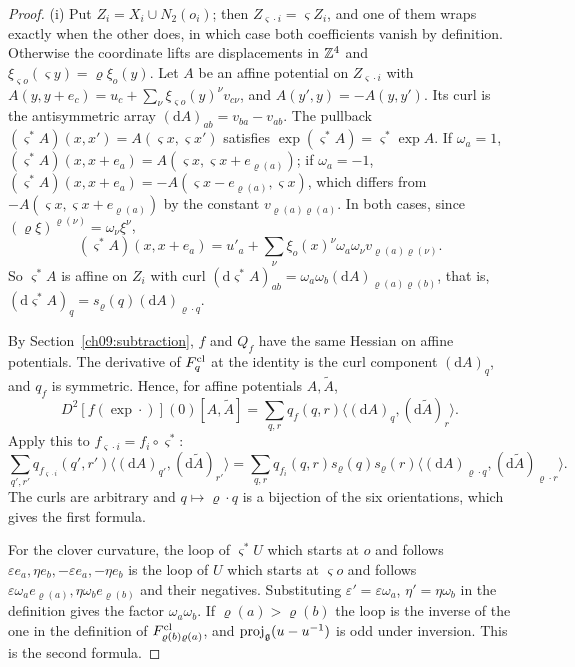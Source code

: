 \begin{proof}
(i) Put $Z_i=X_i\cup N_2(o_i)$; then
$Z_{\varsigma\cdot i}=\varsigma Z_i$, and one of them wraps exactly
when the other does, in which case both coefficients vanish by
definition. Otherwise the coordinate lifts are displacements in $\mathbb Z^4$
and $\xi_{\varsigma o}(\varsigma y)=\varrho\xi_o(y)$. Let $A$ be an
affine potential on $Z_{\varsigma\cdot i}$ with
$A(y,y+e_c)=u_c+\sum_\nu\xi_{\varsigma o}(y)^\nu v_{c\nu}$, and
$A(y',y)=-A(y,y')$. Its curl is the antisymmetric array
$(\mathrm dA)_{ab}=v_{ba}-v_{ab}$. The pullback
$(\varsigma^*A)(x,x')=A(\varsigma x,\varsigma x')$ satisfies
$\exp(\varsigma^*A)=\varsigma^*\exp A$. If $\omega_a=1$,
$(\varsigma^*A)(x,x+e_a)=A(\varsigma x,\varsigma x+e_{\varrho(a)})$;
if $\omega_a=-1$,
$(\varsigma^*A)(x,x+e_a)=-A(\varsigma x-e_{\varrho(a)},\varsigma x)$,
which differs from $-A(\varsigma x,\varsigma x+e_{\varrho(a)})$ by the
constant $v_{\varrho(a)\varrho(a)}$. In both cases, since
$(\varrho\xi)^{\varrho(\nu)}=\omega_\nu\xi^\nu$,
\[
 (\varsigma^*A)(x,x+e_a)=u'_a+\sum_\nu\xi_o(x)^\nu
     \omega_a\omega_\nu v_{\varrho(a)\varrho(\nu)} .
\]
So $\varsigma^*A$ is affine on $Z_i$ with curl
$(\mathrm d\varsigma^*A)_{ab}
=\omega_a\omega_b(\mathrm dA)_{\varrho(a)\varrho(b)}$, that is,
$(\mathrm d\varsigma^*A)_q=s_\varrho(q)(\mathrm dA)_{\varrho\cdot q}$.

By Section~\ref{ch09:subtraction}, $f$ and $Q_f$ have the same
Hessian on affine potentials. The derivative of $F^{\rm cl}_q$ at the
identity is the curl component $(\mathrm dA)_q$, and $q_f$ is
symmetric. Hence, for affine potentials $A,\widetilde A$,
\[
 D^2[f(\exp\cdot)](0)[A,\widetilde A]
     =\sum_{q,r}q_f(q,r)
      \langle(\mathrm dA)_q,(\mathrm d\widetilde A)_r\rangle .
\]
Apply this to $f_{\varsigma\cdot i}=f_i\circ\varsigma^*$:
\[
 \sum_{q',r'}q_{f_{\varsigma\cdot i}}(q',r')
       \langle(\mathrm dA)_{q'},(\mathrm d\widetilde A)_{r'}\rangle
 =\sum_{q,r}q_{f_i}(q,r)s_\varrho(q)s_\varrho(r)
       \langle(\mathrm dA)_{\varrho\cdot q},
              (\mathrm d\widetilde A)_{\varrho\cdot r}\rangle .
\]
The curls are arbitrary and $q\mapsto\varrho\cdot q$ is a bijection of
the six orientations, which gives the first formula.

For the clover curvature, the loop of $\varsigma^*U$ which starts at
$o$ and follows
$\varepsilon e_a,\eta e_b,-\varepsilon e_a,-\eta e_b$ is the loop of
$U$ which starts at $\varsigma o$ and follows
$\varepsilon\omega_ae_{\varrho(a)},\eta\omega_be_{\varrho(b)}$ and
their negatives. Substituting $\varepsilon'=\varepsilon\omega_a$,
$\eta'=\eta\omega_b$ in the definition gives the factor
$\omega_a\omega_b$. If $\varrho(a)>\varrho(b)$ the loop is the
inverse of the one in the definition of
$F^{\rm cl}_{\varrho(b)\varrho(a)}$, and
$\operatorname{proj}_{\mathfrak g}(u-u^{-1})$ is odd under inversion. This is
the second formula.


\end{proof}
